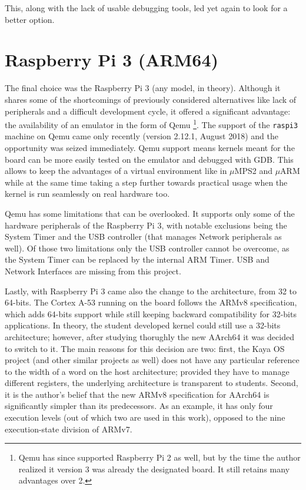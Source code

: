 \documentclass[12pt,a4paper,openright,twoside]{report}
\begin{document}
This, along with the lack of usable debugging tools, led yet again to look for
a better option.

\newpage

\section{Raspberry Pi 3 (ARM64)}
\label{raspberry3}
The final choice was the Raspberry Pi 3 (any model, in theory). Although it shares
some of the shortcomings of previously considered alternatives like lack of 
peripherals and a difficult development cycle, it offered a significant advantage:
the availability of an emulator in the form of Qemu \footnote{Qemu has since 
supported Raspberry Pi 2
as well, but by the time the author realized it version 3 was already the designated
board. It still retains many advantages over 2.}.
The support of the {\tt raspi3} machine on Qemu came only recently (version 2.12.1, August 2018)
and the opportunity was seized immediately. Qemu support means kernels meant for
the board can be more easily tested on the emulator and debugged with GDB.
This allows to keep the advantages of a virtual environment like in $\mu$MPS2 and
$\mu$ARM while at the same time taking a step further towards practical usage
when the kernel is run seamlessly on real hardware too.

Qemu has some limitations that can be overlooked. It supports only some of the
hardware peripherals of the Raspberry Pi 3, with notable exclusions being the
System Timer and the USB controller 
(that manages Network peripherals as well).
Of those two limitations only the USB controller cannot be overcome, as the 
System Timer can be replaced by the internal ARM Timer.
USB and Network Interfaces are missing from this project.

Lastly, with Raspberry Pi 3 came also the change to the architecture, from 32 
to 64-bits. The Cortex A-53 running on the board follows the ARMv8 specification,
which adds 64-bits support while still keeping backward compatibility for 32-bits
applications. In theory, the student developed kernel could still use a 32-bits
architecture; however, after studying thorughly the new AArch64 it was decided
to switch to it.
The main reasons for this decision are two: first, the Kaya OS project (and
other similar projects as well) does not have any particular reference to the
width of a word on the host architecture; provided they have to manage different
registers, the underlying architecture is transparent to students.
Second, it is the author's belief that the new ARMv8 specification for AArch64
is significantly simpler than its predecessors. As an example, it has only four execution
levels (out of which two are used in this work), opposed to the nine execution-state 
division of ARMv7.
\end{document}
